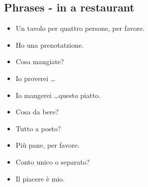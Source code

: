 \newpage

\subsection{Phrases - in a restaurant}
\begin{itemize}
    \item Un tavolo per quattro persone, per favore.\\
    \item Ho una prenotatzione. \\
    \item Cosa mangiate? \\
    \item Io proverei \ldots \\
    \item Io mangerei \ldots questo piatto.\\
    \item Cosa da bere? \\
    \item Tutto a posto? \\
    \item Più pane, per favore. \\
    \item Conto unico o separato? \\
    \item Il piacere è mio. \\
\end{itemize}

